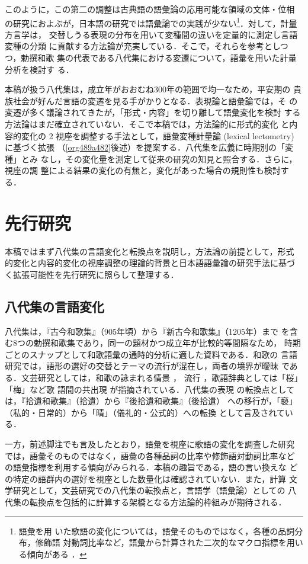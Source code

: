 \documentclass[submit]{ipsj}
\renewcommand{\ref}{\cref}
\begin{document}
このように，この第二の調整は古典語の語彙論の応用可能な領域の文体・位相
の研究におよぶが，日本語の研究では語彙論での実践が少ない\footnote{語彙を用
いた歌語の変化については，語彙そのものではなく，各種の品詞分布，修飾語
対動詞比率など，語彙から計算された二次的なマクロ指標を用いる傾向がある
\cite{nishihata1992Waka,hatano1941Waka}．}．対して，計量方言学は，
交替しうる表現の分布を用いて変種間の違いを定量的に測定し言語変種の分類
に貢献する方法論が充実している．そこで，それらを参考としつつ，勅撰和歌
集の代表である八代集における変遷について，語彙を用いた計量分析を検討す
る．

本稿が扱う八代集は，成立年がおおむね300年の範囲で均一なため，平安期の
貴族社会が好んだ言語の変遷を見る手がかりとなる．表現論と語彙論では，そ
の変遷が多く議論されてきたが，「形式・内容」を切り離して語彙変化を検討
する方法論はまだ確立されていない．そこで本稿では，方法論的に形式的変化
と内容的変化の 2 視座を調整する手法として，語彙変種計量論 (lexical
lectometry) \cite{Speelman2003Profilebased} に基づく拡張
（\ref{org489a482}後述）を提案する．八代集を広義に時期別の「変種」とみ
なし，その変化量を測定して従来の研究の知見と照合する．さらに，視座の調
整による結果の変化の有無と，変化があった場合の規則性も検討する．
\section{先行研究\label{org83d3ae5}}
\label{sec:org3007c3e}
本稿ではまず八代集の言語変化と転換点を説明し，方法論の前提として，形式
的変化と内容的変化の視座調整の理論的背景と日本語語彙論の研究手法に基づ
く拡張可能性を先行研究に照らして整理する．
\subsection{八代集の言語変化\label{orge3e44ee}}
\label{sec:orgd1fe415}
八代集は，『古今和歌集』（905年頃）から『新古今和歌集』（1205年）まで
を含む8つの勅撰和歌集であり，同一の題材かつ成立年が比較的等間隔なため，
時期ごとのスナップとして和歌語彙の通時的分析に適した資料である．和歌の
言語研究では，語形の選好の交替とテーマの流行が混在し，両者の境界が曖昧
である．文芸研究としては，和歌の詠まれる情景 \cite{ueno1976Koshui}，
流行 \cite{kawamura1991Sekkan}，歌語辞典としては「桜」「梅」など歌
語間の共出現 \cite{katagiri1983Uta} が指摘されている．八代集の表現
の転換点としては，『拾遺和歌集』（拾遺）から『後拾遺和歌集』（後拾遺）
への移行が，「褻」（私的・日常的）から「晴」（儀礼的・公式的）への転換
として言及されている\cite{ueno1976Koshui,kawamura1991Sekkan}．

一方，前述脚注でも言及したとおり，語彙を視座に歌語の変化を調査した研究
では，語彙そのものではなく，語彙の各種品詞の比率や修飾語対動詞比率など
の語彙指標を利用する傾向がみられる\cite{tsuji1998Uta,nishihata1992Waka,hatano1941Waka}．本稿の趣旨である，語の言い換えな
どの特定の語群内の選好を視座とした数量化は確認されていない．また，計算
文学研究として，文芸研究での八代集の転換点と，言語学（語彙論）としての
八代集の転換点を包括的に計算する架橋となる方法論的枠組みが期待される．
\end{document}
